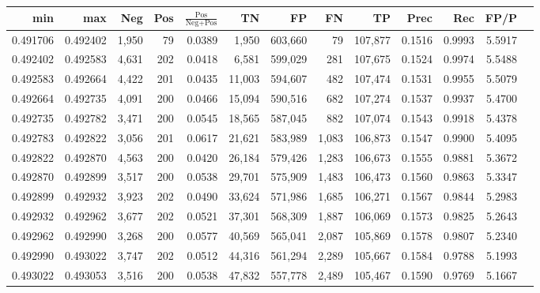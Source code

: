 \begin{tabular}{rrrrrrrrrrrrr}
\toprule
     min &      max &   Neg & Pos & $\frac{\text{Pos}}{\text{Neg}+\text{Pos}}$ &      TN &      FP &      FN &      TP &   Prec &    Rec &   FP/P \\
\midrule
0.491706 & 0.492402 & 1,950 &  79 &                                     0.0389 &   1,950 & 603,660 &      79 & 107,877 & 0.1516 & 0.9993 & 5.5917 \\
0.492402 & 0.492583 & 4,631 & 202 &                                     0.0418 &   6,581 & 599,029 &     281 & 107,675 & 0.1524 & 0.9974 & 5.5488 \\
0.492583 & 0.492664 & 4,422 & 201 &                                     0.0435 &  11,003 & 594,607 &     482 & 107,474 & 0.1531 & 0.9955 & 5.5079 \\
0.492664 & 0.492735 & 4,091 & 200 &                                     0.0466 &  15,094 & 590,516 &     682 & 107,274 & 0.1537 & 0.9937 & 5.4700 \\
0.492735 & 0.492782 & 3,471 & 200 &                                     0.0545 &  18,565 & 587,045 &     882 & 107,074 & 0.1543 & 0.9918 & 5.4378 \\
0.492783 & 0.492822 & 3,056 & 201 &                                     0.0617 &  21,621 & 583,989 &   1,083 & 106,873 & 0.1547 & 0.9900 & 5.4095 \\
0.492822 & 0.492870 & 4,563 & 200 &                                     0.0420 &  26,184 & 579,426 &   1,283 & 106,673 & 0.1555 & 0.9881 & 5.3672 \\
0.492870 & 0.492899 & 3,517 & 200 &                                     0.0538 &  29,701 & 575,909 &   1,483 & 106,473 & 0.1560 & 0.9863 & 5.3347 \\
0.492899 & 0.492932 & 3,923 & 202 &                                     0.0490 &  33,624 & 571,986 &   1,685 & 106,271 & 0.1567 & 0.9844 & 5.2983 \\
0.492932 & 0.492962 & 3,677 & 202 &                                     0.0521 &  37,301 & 568,309 &   1,887 & 106,069 & 0.1573 & 0.9825 & 5.2643 \\
0.492962 & 0.492990 & 3,268 & 200 &                                     0.0577 &  40,569 & 565,041 &   2,087 & 105,869 & 0.1578 & 0.9807 & 5.2340 \\
0.492990 & 0.493022 & 3,747 & 202 &                                     0.0512 &  44,316 & 561,294 &   2,289 & 105,667 & 0.1584 & 0.9788 & 5.1993 \\
0.493022 & 0.493053 & 3,516 & 200 &                                     0.0538 &  47,832 & 557,778 &   2,489 & 105,467 & 0.1590 & 0.9769 & 5.1667 \\

\end{tabular}
